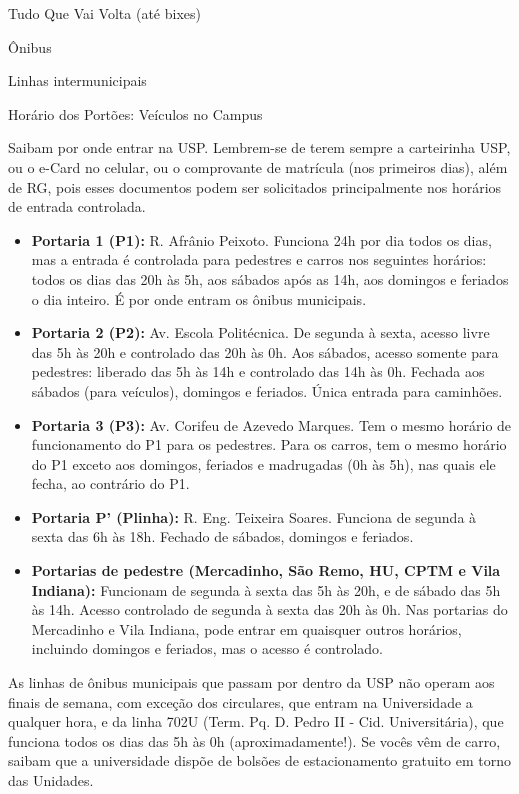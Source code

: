 \begin{secao}{Tudo Que Vai Volta (até bixes)}
\begin{subsecao}{Ônibus}
\begin{subsubsecao}{Linhas intermunicipais}
\end{subsubsecao}

\end{subsecao}


\begin{subsecao}{Horário dos Portões: Veículos no Campus}

Saibam por onde entrar na USP. Lembrem-se de terem sempre a carteirinha USP, ou
o e-Card no celular, ou o comprovante de matrícula (nos primeiros dias), além de
RG, pois esses documentos podem ser solicitados principalmente nos horários de 
entrada controlada.
\begin{itemize}
  \item {\bf Portaria 1 (P1):} R. Afrânio Peixoto. Funciona 24h por dia todos os
  	dias, mas a entrada é controlada para pedestres e carros nos seguintes
	horários: todos os dias das 20h às 5h, aos sábados após as 14h, aos domingos
	e feriados o dia inteiro. É por onde entram os ônibus municipais.

  \item {\bf Portaria 2 (P2):} Av. Escola Politécnica. De segunda à sexta,
  	acesso livre das 5h às 20h e controlado das 20h às 0h. Aos sábados, acesso
	somente para pedestres: liberado das 5h às 14h e controlado das 14h às 0h.
	Fechada aos sábados (para veículos), domingos e feriados. Única entrada para
	caminhões.

  \item {\bf Portaria 3 (P3):} Av. Corifeu de Azevedo Marques. Tem o mesmo
  	horário de funcionamento do P1 para os pedestres. Para os carros, tem o
	mesmo horário do P1 exceto aos domingos, feriados e madrugadas (0h às 5h),
	nas quais ele fecha, ao contrário do P1.

  \item {\bf Portaria P' (Plinha):} R. Eng. Teixeira Soares. Funciona de segunda
  	à sexta das 6h às 18h. Fechado de sábados, domingos e feriados.

  \item {\bf Portarias de pedestre (Mercadinho, São Remo, HU, CPTM e
  	Vila Indiana):} Funcionam de segunda à sexta das 5h às 20h, e de sábado
	das 5h às 14h. Acesso controlado de segunda à sexta das 20h às 0h.
	Nas portarias do Mercadinho e Vila Indiana, pode entrar em quaisquer
	outros horários, incluindo domingos e feriados, mas o acesso é controlado.

\end{itemize}

As linhas de ônibus municipais que passam por dentro da USP não operam aos
finais de semana, com exceção dos circulares, que entram na Universidade a
qualquer hora, e da linha 702U (Term. Pq. D. Pedro II - Cid. Universitária), que
funciona todos os dias das 5h às 0h (aproximadamente!). Se vocês vêm de carro,
saibam que a universidade dispõe de bolsões de estacionamento gratuito em torno
das Unidades.


\end{subsecao}
\end{secao}
